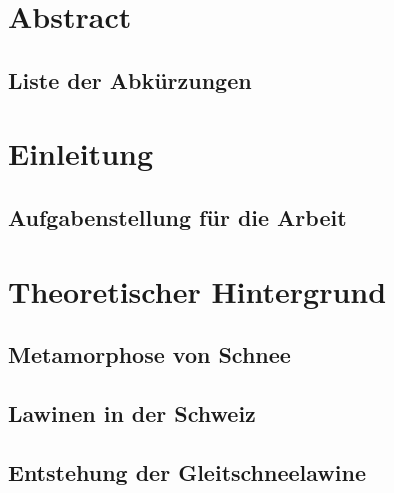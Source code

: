 \documentclass[a4paper,12pt]{article}
\begin{document}
\begin{titlepage}
  \end{titlepage}



\pagestyle{empty}
\section*{Abstract}


\newpage
\subsection*{Liste der Abkürzungen}

\newpage
\tableofcontents
\newpage
\pagestyle{fancy}

\setcounter{page}{1}
\section{Einleitung}


\newpage
\subsection{Aufgabenstellung für die Arbeit}
\label{sec:aufgabe}


\newpage
\section{Theoretischer Hintergrund}

\subsection{Metamorphose von Schnee}
\label{sec:Meta}


\newpage
\subsection{Lawinen in der Schweiz}


\subsection{Entstehung der Gleitschneelawine}


%
\newpage
\end{document}
